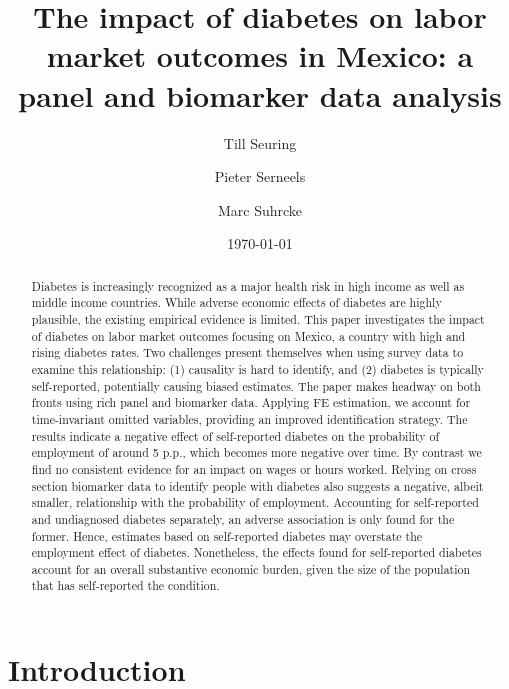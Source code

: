 \documentclass[12pt,english]{article}
\begin{document}
\title{The impact of diabetes on labor market outcomes in Mexico: a panel and biomarker data analysis}

\author[*]{Till Seuring}
\author[*]{Pieter Serneels}
\author[**]{Marc Suhrcke}

\date{\today}


\maketitle 


\begin{abstract}
Diabetes is increasingly recognized as a major health risk in high income as well as middle income countries. While adverse economic effects of diabetes are highly plausible, the existing empirical evidence is limited. This paper investigates the impact of diabetes on labor market outcomes focusing on Mexico, a country with high and rising diabetes rates. Two challenges present themselves when using survey data to examine this relationship: (1) causality is hard to identify, and (2) diabetes is typically self-reported, potentially causing biased estimates. The paper makes headway on both fronts using rich panel and biomarker data. Applying \ac{FE} estimation, we account for time-invariant omitted variables, providing an improved identification strategy. The results indicate a negative effect of self-reported diabetes on the probability of employment of around 5 \ac{p.p.}, which becomes more negative over time. By contrast we find no consistent evidence for an impact on wages or hours worked. Relying on cross section biomarker data to identify people with diabetes also suggests a negative, albeit smaller, relationship with the probability of employment. Accounting for self-reported and undiagnosed diabetes separately, an adverse association is only found for the former. Hence, estimates based on self-reported diabetes may overstate the employment effect of diabetes. Nonetheless, the effects found for self-reported diabetes account for an overall substantive economic burden, given the size of the population that has self-reported the condition.
\end{abstract}

\section{\label{sec:Introduction}Introduction }
\end{document}
